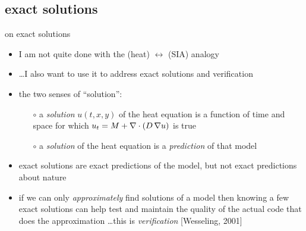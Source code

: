 \subsection{exact solutions}

\begin{frame}{on exact solutions}

\begin{itemize}
\item I am not quite done with the (heat) $\leftrightarrow$ (SIA) analogy
\item \dots I also want to use it to address exact solutions and verification

\bigskip
\item the two senses of ``solution'':
  \begin{itemize}
  \small
  \item[$\circ$] a \emph{solution} $u(t,x,y)$ of the heat equation is a function of time and space for which $u_t = M + \nabla\cdot (D\, \nabla u)$ is true
  \item[$\circ$] a \emph{solution} of the heat equation is a \emph{prediction} of that model
  \normalsize
  \end{itemize}
\item exact solutions are exact predictions of the model, but not exact predictions about nature
\item if we can only \emph{approximately} find solutions of a model then knowing a few exact solutions can help test and maintain the quality of the actual code that does the approximation \dots this is \emph{verification} [Wesseling, 2001]
\end{itemize}
\end{frame}


